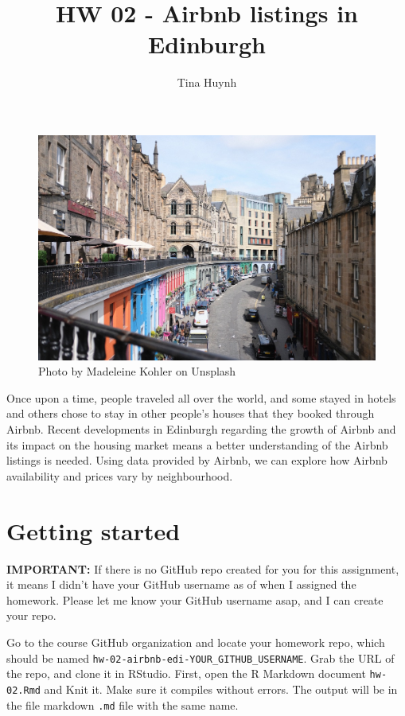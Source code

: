 \documentclass[
]{article}
\title{HW 02 - Airbnb listings in Edinburgh}
\author{Tina Huynh}
\date{}
\begin{document}
\maketitle

\begin{figure}
\includegraphics[width=0.8\linewidth]{img/madeleine-kohler-90Qn643Pq9c-unsplash} \caption{Photo by Madeleine Kohler on Unsplash}\label{fig:photo}
\end{figure}

Once upon a time, people traveled all over the world, and some stayed in
hotels and others chose to stay in other people's houses that they
booked through Airbnb. Recent developments in Edinburgh regarding the
growth of Airbnb and its impact on the housing market means a better
understanding of the Airbnb listings is needed. Using data provided by
Airbnb, we can explore how Airbnb availability and prices vary by
neighbourhood.

\section{Getting started}\label{getting-started}

\begin{marginnote}
\textbf{IMPORTANT:} If there is no GitHub repo created for you for this
assignment, it means I didn't have your GitHub username as of when I
assigned the homework. Please let me know your GitHub username asap, and
I can create your repo.
\end{marginnote}

Go to the course GitHub organization and locate your homework repo,
which should be named \texttt{hw-02-airbnb-edi-YOUR\_GITHUB\_USERNAME}.
Grab the URL of the repo, and clone it in RStudio. First, open the R
Markdown document \texttt{hw-02.Rmd} and Knit it. Make sure it compiles
without errors. The output will be in the file markdown \texttt{.md}
file with the same name.
\end{document}
